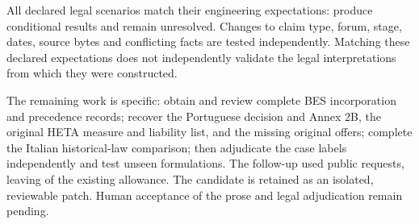 \documentclass[11pt,a4paper]{article}
\begin{document}
All \LegalCases{} declared legal scenarios match their engineering expectations:
\LegalConditional{} produce conditional results and \LegalUnresolved{} remain
unresolved. Changes to claim type, forum, stage, dates, source bytes and
conflicting facts are tested independently. Matching these declared
expectations does not independently validate the legal interpretations from
which they were constructed.

The remaining work is specific: obtain and review complete BES incorporation
and precedence records; recover the Portuguese decision and Annex 2B, the
original HETA measure and liability list, and the missing original offers;
complete the Italian historical-law comparison; then adjudicate the case labels
independently and test unseen formulations. The follow-up used \NewRequests{}
public requests, leaving \RemainingRequests{} of the existing allowance.
The candidate is retained as an isolated, reviewable patch. Human acceptance of
the prose and legal adjudication remain pending.
\end{document}

